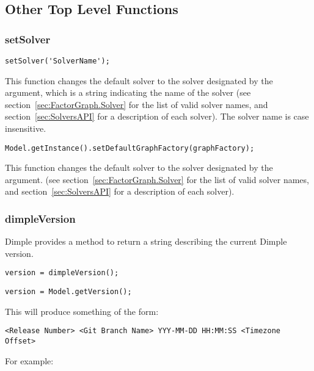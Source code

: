 \subsection{Other Top Level Functions}

\subsubsection{setSolver}

\ifmatlab
\begin{lstlisting}
setSolver('SolverName');
\end{lstlisting}

This function changes the default solver to the solver designated by the argument, which is a string indicating the name of the solver (see section~\ref{sec:FactorGraph.Solver} for the list of valid solver names, and section~\ref{sec:SolversAPI} for a description of each solver).  The solver name is case insensitive.
\fi

\ifjava
\begin{lstlisting}
Model.getInstance().setDefaultGraphFactory(graphFactory);
\end{lstlisting}

This function changes the default solver to the solver designated by the argument.   (see section~\ref{sec:FactorGraph.Solver} for the list of valid solver names, and section~\ref{sec:SolversAPI} for a description of each solver).  
\fi

\subsubsection{dimpleVersion}

Dimple provides a method to return a string describing the current Dimple version.

\ifmatlab
\begin{lstlisting}
version = dimpleVersion();
\end{lstlisting}
\fi

\ifjava
\begin{lstlisting}
version = Model.getVersion();
\end{lstlisting}
\fi

This will produce something of the form:

\begin{lstlisting}
<Release Number> <Git Branch Name> YYY-MM-DD HH:MM:SS <Timezone Offset>
\end{lstlisting}

For example:

